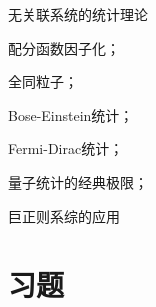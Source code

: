 \begin{review}
    \item 无关联系统的统计理论
    \item 配分函数因子化；
    \item 全同粒子；
    \item Bose-Einstein统计；
    \item Fermi-Dirac统计；
    \item 量子统计的经典极限；
    \item 巨正则系综的应用
\end{review}
\section{习题} %
\label{sec:习题4}



